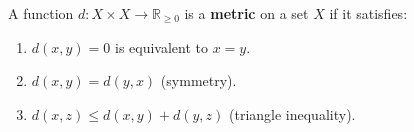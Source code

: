 A function $d : X \times X \to \mathbb{R}_{\geq 0}$ is a \textbf{metric} on a set $X$ if it satisfies:

\begin{enumerate}
\item $d(x, y) = 0$ is equivalent to $x = y$.
\item $d(x, y) = d(y, x)$ (symmetry).
\item $d(x, z) \leq d(x, y) + d(y, z)$ (triangle inequality).
\end{enumerate}
